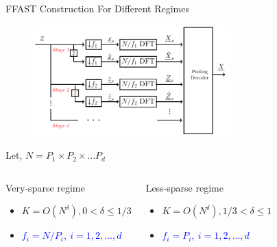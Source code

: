 \documentclass[10pt,xcolor=table]{beamer}
\begin{document}
	\begin{frame}{FFAST Construction For Different Regimes}

	\begin{figure}[t]
		\includegraphics[width=3.0in]{./Figures/FFAST_2stages}
	\end{figure}
	
	

			Let, $N=P_1 \times P_2 \times \ldots P_d$
	\begin{columns}
		
		
		\begin{block}{\alert{Very-sparse regime}}
			\begin{itemize}
				\item $K = O(N^\delta), 0<\delta \leq 1/3$
				\item \textcolor{blue}{$f_i= N/P_i,\ i=1,2, \ldots,d$}
				\end{itemize}
				\end{block}
				
				\begin{block}{\alert{Less-sparse regime}}
					\begin{itemize}
						\item $K = O(N^\delta), 1/3<\delta \leq 1$
						\item \textcolor{blue}{$f_i= P_i,\ i=1,2, \ldots,d$}
						\end{itemize}
						\end{block}
						
						\end{columns}
							

			\end{frame}
\end{document}

